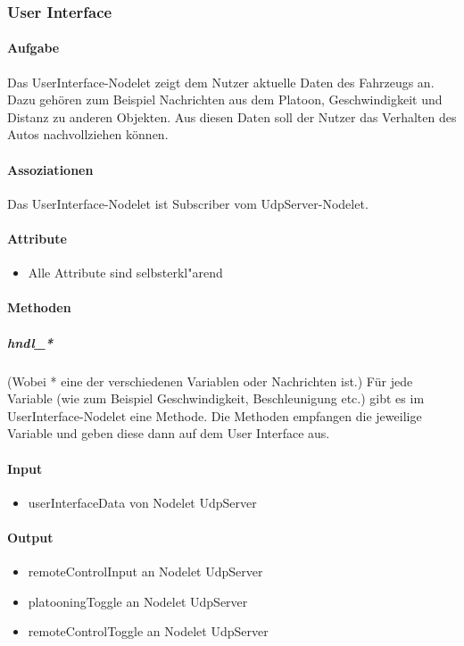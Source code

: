 \documentclass[a4paper, 12pt, titlepage]{scrartcl}
\begin{document}
		    \subsubsection{User Interface}
			\label{user_interfcae}
				\paragraph{Aufgabe} Das UserInterface-Nodelet zeigt dem Nutzer aktuelle Daten des Fahrzeugs an. Dazu gehören zum Beispiel Nachrichten aus dem Platoon, Geschwindigkeit und Distanz zu anderen Objekten. Aus diesen Daten soll der Nutzer das Verhalten des Autos nachvollziehen können.
				\paragraph{Assoziationen} Das UserInterface-Nodelet ist Subscriber vom UdpServer-Nodelet.
				\paragraph{Attribute}
					\begin{itemize}
					    \item Alle Attribute sind selbsterkl"arend
					\end{itemize}
				\paragraph{Methoden}
					\subparagraph{hndl\_*} (Wobei * eine der verschiedenen Variablen oder Nachrichten ist.) Für jede Variable (wie zum Beispiel Geschwindigkeit, Beschleunigung etc.) gibt es im UserInterface-Nodelet eine Methode. Die Methoden empfangen die jeweilige Variable und geben diese dann auf dem User Interface aus.
				\paragraph{Input}
				    \begin{itemize}
				        \item userInterfaceData von Nodelet UdpServer
				    \end{itemize}
				\paragraph{Output}
				    \begin{itemize}
				        \item remoteControlInput an Nodelet UdpServer
				        \item platooningToggle an Nodelet UdpServer
				        \item remoteControlToggle an Nodelet UdpServer
				    \end{itemize}
\end{document}
